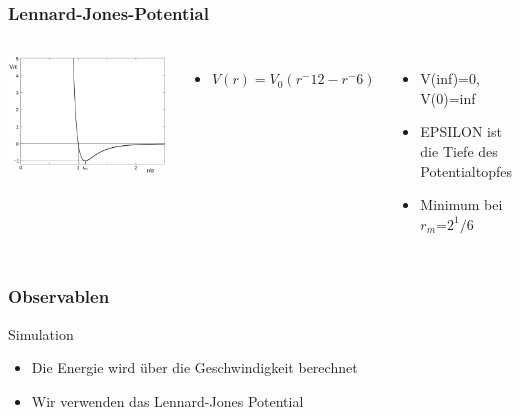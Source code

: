 \documentclass[11pt]{beamer}
\begin{document}
\begin{frame}
  \frametitle{Lennard-Jones-Potential}
   \vspace{-0.3cm}
  \begin{columns}
                \includegraphics[width=\textwidth]{img/LennardJonesPotential.png}
                \begin{itemize}
                \item ${V(r)=V_0 (r^-12-r^-6)}$ %
                \end{itemize}
        \pause
                \begin{itemize}
                \item V(inf)=0, V(0)=inf
                \item EPSILON ist die Tiefe des Potentialtopfes
      			\item Minimum bei ${r_m}$=${2^1/6}$ %
    			\end{itemize}
  \end{columns}
\end{frame}

\begin{frame}
  \frametitle{Observablen}
   \begin{block}{Simulation}
    \begin{itemize}
      \item Die Energie wird über die Geschwindigkeit berechnet
      \item Wir verwenden das Lennard-Jones Potential
    \end{itemize}
  \end{block}
\end{frame}
\end{document}
